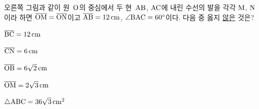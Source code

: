\noindent\begin{minipage}[t]{0.58\linewidth}\vspace{0pt}\raggedright 오른쪽 그림과 같이 원~$\mathrm{O}$의 중심에서 두 현~$\mathrm{AB}$, $\mathrm{AC}$에 내린 수선의 발을 각각 $\mathrm{M}$, $\mathrm{N}$이라 하면 $\overline{\mathrm{OM}}=\overline{\mathrm{ON}}$이고 $\overline{\mathrm{AB}}=12\,\mathrm{cm}$, $\angle\mathrm{BAC}=60^\circ$이다. 다음 중 옳지 \underline{않은} 것은?\end{minipage}\hfill\begin{minipage}[t]{0.4\linewidth}\vspace{0pt}\centering \resizebox{\ifdim\width>\linewidth\linewidth\else\width\fi}{!}{}\end{minipage}\par
\begin{choicesv}{\rule[-3ex]{0pt}{8ex}$\overline{\mathrm{BC}}=12\,\mathrm{cm}$}{\rule[-3ex]{0pt}{8ex}$\overline{\mathrm{CN}}=6\,\mathrm{cm}$}{\rule[-3ex]{0pt}{8ex}$\overline{\mathrm{OB}}=6\sqrt{2}\,\mathrm{cm}$}{\rule[-3ex]{0pt}{8ex}$\overline{\mathrm{OM}}=2\sqrt{3}\,\mathrm{cm}$}{\rule[-3ex]{0pt}{8ex}$\triangle\mathrm{ABC}=36\sqrt{3}\,\mathrm{cm}^2$}\end{choicesv}
